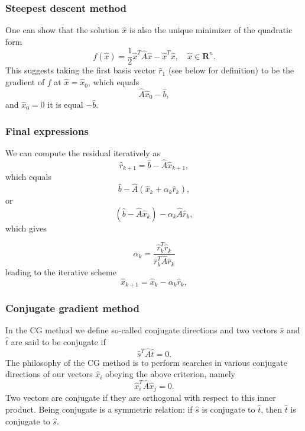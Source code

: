 \documentclass{beamer}
\begin{document}
\begin{frame}
\frametitle{Steepest descent  method}

\begin{block}{}
One can show that the solution $\hat{x}$ is also the unique minimizer of the quadratic form
\begin{equation*}
  f(\hat{x}) = \frac{1}{2}\hat{x}^T\hat{A}\hat{x} - \hat{x}^T \hat{x} , \quad \hat{x}\in\mathbf{R}^n. 
\end{equation*}
This suggests taking the first basis vector $\hat{r}_1$ (see below for definition) 
to be the gradient of $f$ at $\hat{x}=\hat{x}_0$, 
which equals
\begin{equation*}
\hat{A}\hat{x}_0-\hat{b},
\end{equation*}
and 
$\hat{x}_0=0$ it is equal $-\hat{b}$.

\end{block}
\end{frame}

\begin{frame}
\frametitle{Final expressions}

\begin{block}{}
We can compute the residual iteratively as
\begin{equation*}
\hat{r}_{k+1}=\hat{b}-\hat{A}\hat{x}_{k+1},
 \end{equation*}
which equals
\begin{equation*}
\hat{b}-\hat{A}(\hat{x}_k+\alpha_k\hat{r}_k),
 \end{equation*}
or
\begin{equation*}
(\hat{b}-\hat{A}\hat{x}_k)-\alpha_k\hat{A}\hat{r}_k,
 \end{equation*}
which gives

\[
\alpha_k = \frac{\hat{r}_k^T\hat{r}_k}{\hat{r}_k^T\hat{A}\hat{r}_k}
\]
leading to the iterative scheme
\begin{equation*}
\hat{x}_{k+1}=\hat{x}_k-\alpha_k\hat{r}_{k},
 \end{equation*}
\end{block}
\end{frame}

\begin{frame}
\frametitle{Conjugate gradient method}

\begin{block}{}
In the CG method we define so-called conjugate directions and two vectors 
$\hat{s}$ and $\hat{t}$
are said to be
conjugate if
\begin{equation*}
\hat{s}^T\hat{A}\hat{t}= 0.
\end{equation*}
The philosophy of the CG method is to perform searches in various conjugate directions
of our vectors $\hat{x}_i$ obeying the above criterion, namely
\begin{equation*}
\hat{x}_i^T\hat{A}\hat{x}_j= 0.
\end{equation*}
Two vectors are conjugate if they are orthogonal with respect to 
this inner product. Being conjugate is a symmetric relation: if $\hat{s}$ is conjugate to $\hat{t}$, then $\hat{t}$ is conjugate to $\hat{s}$.
\end{block}
\end{frame}
\end{document}
